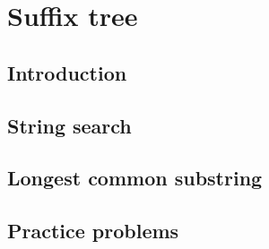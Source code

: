 \section{Suffix tree}

\subsection{Introduction}

\subsection{String search}

\subsection{Longest common substring}

\subsection{Practice problems}
